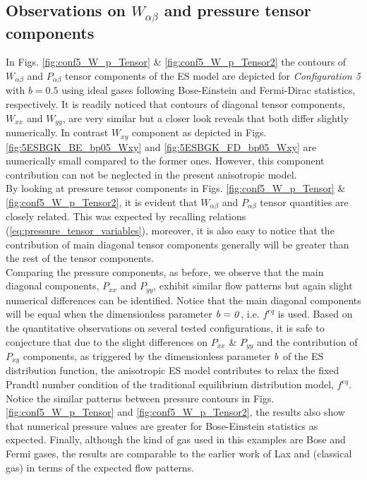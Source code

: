 \documentclass{rsproca}%
\begin{document}
\subsection{Observations on $W_{\alpha \beta}$ and pressure tensor components}
In Figs. \ref{fig:conf5_W_p_Tensor} \& \ref{fig:conf5_W_p_Tensor2} the contours of $W_{\alpha \beta}$ and $P_{\alpha \beta}$ tensor components of the ES model are depicted for \emph{Configuration 5} with $b=0.5$ using ideal gases following Bose-Einstein and Fermi-Dirac statistics, respectively. It is readily noticed that contours of diagonal tensor components, $W_{xx}$ and $W_{yy}$, are very similar but a closer look reveals that both differ slightly numerically. In contrast $W_{xy}$ component as depicted in Figs. \ref{fig:5ESBGK_BE_bp05_Wxy} and \ref{fig:5ESBGK_FD_bp05_Wxy} are numerically small compared to the former ones. However, this component contribution can not be neglected in the present anisotropic model. \\
By looking at pressure tensor components in Figs. \ref{fig:conf5_W_p_Tensor} \& \ref{fig:conf5_W_p_Tensor2}, it is evident that $W_{\alpha \beta}$ and $P_{\alpha \beta}$ tensor quantities are closely related. This was expected by recalling relations (\ref{eq:pressure_tensor_variables}), moreover, it is also easy to notice that the contribution of main diagonal tensor components generally will be greater than the rest of the tensor components. \\
Comparing the pressure components, as before, we observe that the main diagonal components, $P_{xx}$ and $P_{yy}$, exhibit similar flow patterns but again slight numerical differences can be identified.  Notice that the main diagonal components will be equal when the dimensionless parameter $\it{b = 0}$, i.e. $f^{eq}$ is used.  Based on the quantitative observations on several tested configurations, it is safe to conjecture that due to the slight differences on $P_{xx}$ \& $P_{yy}$ and the contribution of $P_{xy}$ components, as triggered by the dimensionless parameter $\it{b}$ of the ES distribution function, the anisotropic ES model contributes to relax the fixed Prandtl number condition of the traditional equilibrium distribution model, $f^{eq}$. \\
Notice the similar patterns between pressure contours in Figs. \ref{fig:conf5_W_p_Tensor} and \ref{fig:conf5_W_p_Tensor2}, the results also show that numerical pressure values are greater for Bose-Einstein statistics as expected.  Finally, although the kind of gas used in this examples are Bose and Fermi gases, the results are comparable to the earlier work of Lax \cite{Laxliu95} and \cite{schultzrinne} (classical gas) in terms of the expected flow patterns.
\end{document}
